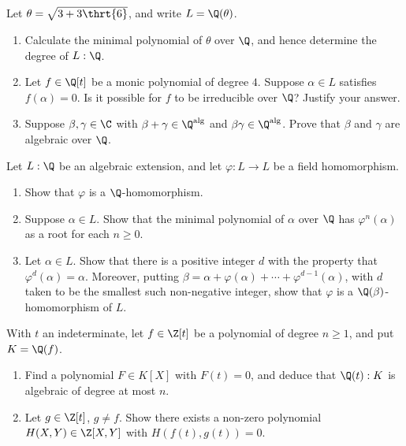 \documentclass{article}
\begin{document}
 Let \( \theta = \sqrt{3 + 3\thrt{6}} \), and write \( L = \Q(\theta) \).
\begin{enumerate}[label=(\alph*)]
  \item Calculate the minimal polynomial of \( \theta \) over \( \Q \), and hence determine the degree of \( L : \Q \).
  \item Let \( f \in \Q[t] \) be a monic polynomial of degree \( 4 \). Suppose \( \alpha \in L \) satisfies \( f(\alpha) = 0 \). Is it possible for \( f \) to be irreducible over \( \Q \)? Justify your answer.
  \item Suppose \( \beta, \gamma \in \C \) with \( \beta + \gamma \in \Q^{\text{alg}} \) and \( \beta \gamma \in \Q^{\text{alg}} \). Prove that \( \beta \) and \( \gamma \) are algebraic over \( \Q \).
\end{enumerate}

 Let \( L : \Q \) be an algebraic extension, and let \( \varphi : L \to L \) be a field homomorphism.
\begin{enumerate}[label=(\alph*)]
  \item Show that \( \varphi \) is a \( \Q \)-homomorphism.
  \item Suppose \( \alpha \in L \). Show that the minimal polynomial of \( \alpha \) over \( \Q \) has \( \varphi^n(\alpha) \) as a root for each \( n \geq 0 \).
  \item Let \( \alpha\in L \). Show that there is a positive integer \( d \) with the property that \( \varphi^d(\alpha) = \alpha \). Moreover, putting \( \beta = \alpha + \varphi(\alpha) + \cdots + \varphi^{d-1}(\alpha) \), with \( d \) taken to be the smallest such non-negative integer, show that \( \varphi \) is a \( \Q(\beta) \)-homomorphism of \( L \).
\end{enumerate}

 With \( t \) an indeterminate, let \( f \in \Z[t] \) be a polynomial of degree \( n \geq 1 \), and put \( K = \Q(f) \).
\begin{enumerate}[label=(\alph*)]
  \item Find a polynomial \( F \in K[X] \) with \( F(t) = 0 \), and deduce that \( \Q(t) : K \) is algebraic of degree at most \( n \).
  \item Let \( g \in \Z[t] \), \( g \ne f \). Show there exists a non-zero polynomial \( H(X, Y) \in \Z[X, Y] \) with \( H(f(t), g(t)) = 0 \).
\end{enumerate}
\end{document}
